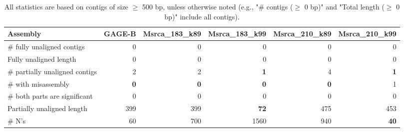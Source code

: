 \documentclass[12pt,a4paper]{article}
\begin{document}
\begin{table}[ht]
\begin{center}
\caption{All statistics are based on contigs of size $\geq$ 500 bp, unless otherwise noted (e.g., "\# contigs ($\geq$ 0 bp)" and "Total length ($\geq$ 0 bp)" include all contigs).}
\begin{tabular}{|l*{5}{|r}|}
\hline
Assembly & GAGE-B & Msrca\_183\_k89 & Msrca\_183\_k99 & Msrca\_210\_k89 & Msrca\_210\_k99 \\ \hline
\# fully unaligned contigs & 0 & 0 & 0 & 0 & 0 \\ \hline
Fully unaligned length & 0 & 0 & 0 & 0 & 0 \\ \hline
\# partially unaligned contigs & 2 & 2 & {\bf 1} & 4 & {\bf 1} \\ \hline
\hspace{5mm}\# with misassembly & {\bf 0} & {\bf 0} & {\bf 0} & {\bf 0} & 1 \\ \hline
\hspace{5mm}\# both parts are significant & 0 & 0 & 0 & 0 & 0 \\ \hline
Partially unaligned length & 399 & 399 & {\bf 72} & 475 & 453 \\ \hline
\# N's & 60 & 700 & 1560 & 940 & {\bf 40} \\ \hline
\end{tabular}
\end{center}
\end{table}
\end{document}
